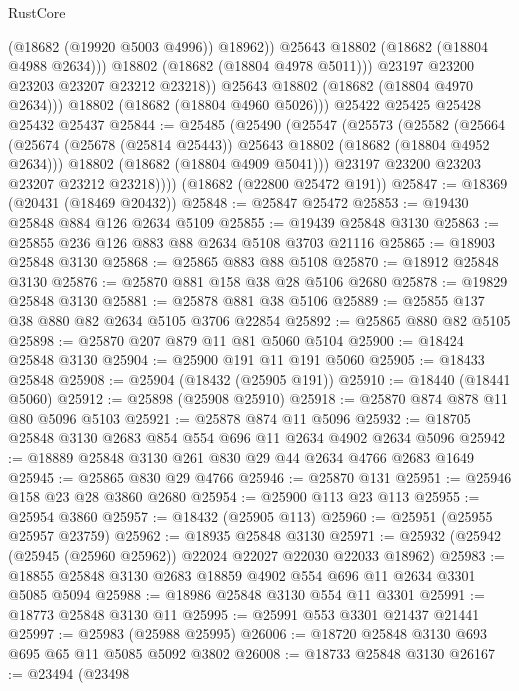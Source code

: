\begin{lexlean}{RustCore}
\begin{coremodule}
                    (@18682 (@19920 @5003 @4996))
                    @18962))
                @25643
                @18802
                (@18682 (@18804 @4988 @2634)))
              @18802
              (@18682 (@18804 @4978 @5011)))
            @23197
            @23200
            @23203
            @23207
            @23212
            @23218))
        @25643
        @18802
        (@18682 (@18804 @4970 @2634)))
      @18802
      (@18682 (@18804 @4960 @5026)))
    @25422
    @25425
    @25428
    @25432
    @25437
@25844 := @25485
    (@25490
      (@25547
        (@25573
          (@25582
            (@25664
              (@25674 (@25678 (@25814 @25443)) @25643 @18802 (@18682 (@18804 @4952 @2634)))
              @18802
              (@18682 (@18804 @4909 @5041)))
            @23197
            @23200
            @23203
            @23207
            @23212
            @23218))))
    (@18682 (@22800 @25472 @191))
@25847 := @18369 (@20431 (@18469 @20432))
@25848 := @25847 @25472
@25853 := @19430 @25848 @884 @126 @2634 @5109
@25855 := @19439 @25848 @3130
@25863 := @25855 @236 @126 @883 @88 @2634 @5108 @3703 @21116
@25865 := @18903 @25848 @3130
@25868 := @25865 @883 @88 @5108
@25870 := @18912 @25848 @3130
@25876 := @25870 @881 @158 @38 @28 @5106 @2680
@25878 := @19829 @25848 @3130
@25881 := @25878 @881 @38 @5106
@25889 := @25855 @137 @38 @880 @82 @2634 @5105 @3706 @22854
@25892 := @25865 @880 @82 @5105
@25898 := @25870 @207 @879 @11 @81 @5060 @5104
@25900 := @18424 @25848 @3130
@25904 := @25900 @191 @11 @191 @5060
@25905 := @18433 @25848
@25908 := @25904 (@18432 (@25905 @191))
@25910 := @18440 (@18441 @5060)
@25912 := @25898 (@25908 @25910)
@25918 := @25870 @874 @878 @11 @80 @5096 @5103
@25921 := @25878 @874 @11 @5096
@25932 := @18705 @25848 @3130 @2683 @854 @554 @696 @11 @2634 @4902 @2634 @5096
@25942 := @18889 @25848 @3130 @261 @830 @29 @44 @2634 @4766 @2683 @1649
@25945 := @25865 @830 @29 @4766
@25946 := @25870 @131
@25951 := @25946 @158 @23 @28 @3860 @2680
@25954 := @25900 @113 @23 @113
@25955 := @25954 @3860
@25957 := @18432 (@25905 @113)
@25960 := @25951 (@25955 @25957 @23759)
@25962 := @18935 @25848 @3130
@25971 := @25932 (@25942 (@25945 (@25960 @25962)) @22024 @22027 @22030 @22033 @18962)
@25983 := @18855 @25848 @3130 @2683 @18859 @4902 @554 @696 @11 @2634 @3301 @5085 @5094
@25988 := @18986 @25848 @3130 @554 @11 @3301
@25991 := @18773 @25848 @3130 @11
@25995 := @25991 @553 @3301 @21437 @21441
@25997 := @25983 (@25988 @25995)
@26006 := @18720 @25848 @3130 @693 @695 @65 @11 @5085 @5092 @3802
@26008 := @18733 @25848 @3130
@26167 := @23494
    (@23498

\end{coremodule}
\end{lexlean}
